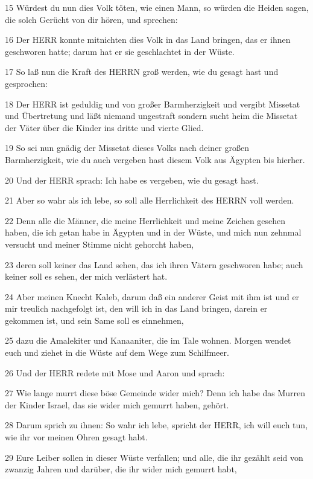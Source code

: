 \par 15 Würdest du nun dies Volk töten, wie einen Mann, so würden die Heiden sagen, die solch Gerücht von dir hören, und sprechen:
\par 16 Der HERR konnte mitnichten dies Volk in das Land bringen, das er ihnen geschworen hatte; darum hat er sie geschlachtet in der Wüste.
\par 17 So laß nun die Kraft des HERRN groß werden, wie du gesagt hast und gesprochen:
\par 18 Der HERR ist geduldig und von großer Barmherzigkeit und vergibt Missetat und Übertretung und läßt niemand ungestraft sondern sucht heim die Missetat der Väter über die Kinder ins dritte und vierte Glied.
\par 19 So sei nun gnädig der Missetat dieses Volks nach deiner großen Barmherzigkeit, wie du auch vergeben hast diesem Volk aus Ägypten bis hierher.
\par 20 Und der HERR sprach: Ich habe es vergeben, wie du gesagt hast.
\par 21 Aber so wahr als ich lebe, so soll alle Herrlichkeit des HERRN voll werden.
\par 22 Denn alle die Männer, die meine Herrlichkeit und meine Zeichen gesehen haben, die ich getan habe in Ägypten und in der Wüste, und mich nun zehnmal versucht und meiner Stimme nicht gehorcht haben,
\par 23 deren soll keiner das Land sehen, das ich ihren Vätern geschworen habe; auch keiner soll es sehen, der mich verlästert hat.
\par 24 Aber meinen Knecht Kaleb, darum daß ein anderer Geist mit ihm ist und er mir treulich nachgefolgt ist, den will ich in das Land bringen, darein er gekommen ist, und sein Same soll es einnehmen,
\par 25 dazu die Amalekiter und Kanaaniter, die im Tale wohnen. Morgen wendet euch und ziehet in die Wüste auf dem Wege zum Schilfmeer.
\par 26 Und der HERR redete mit Mose und Aaron und sprach:
\par 27 Wie lange murrt diese böse Gemeinde wider mich? Denn ich habe das Murren der Kinder Israel, das sie wider mich gemurrt haben, gehört.
\par 28 Darum sprich zu ihnen: So wahr ich lebe, spricht der HERR, ich will euch tun, wie ihr vor meinen Ohren gesagt habt.
\par 29 Eure Leiber sollen in dieser Wüste verfallen; und alle, die ihr gezählt seid von zwanzig Jahren und darüber, die ihr wider mich gemurrt habt,
